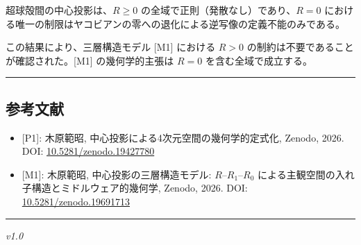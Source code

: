\documentclass[
  a4paper]{ltjsarticle}
\providecommand{\tightlist}{%
  \setlength{\itemsep}{0pt}\setlength{\parskip}{0pt}}
\begin{document}
超球殻間の中心投影は、\(R \geq 0\)
の全域で正則（発散なし）であり、\(R = 0\)
における唯一の制限はヤコビアンの零への退化による逆写像の定義不能のみである。

この結果により、三層構造モデル {[}M1{]} における \(R > 0\)
の制約は不要であることが確認された。{[}M1{]} の幾何学的主張は \(R = 0\)
を含む全域で成立する。

\begin{center}\rule{0.5\linewidth}{0.5pt}\end{center}

\subsection{参考文献}\label{ux53c2ux8003ux6587ux732e}

\begin{itemize}
\tightlist
\item
  {[}P1{]}: 木原範昭, 中心投影による4次元空間の幾何学的定式化, Zenodo,
  2026. DOI:
  \href{https://doi.org/10.5281/zenodo.19427780}{10.5281/zenodo.19427780}
\item
  {[}M1{]}: 木原範昭, 中心投影の三層構造モデル: \(R\)--\(R_1\)--\(R_0\)
  による主観空間の入れ子構造とミドルウェア的幾何学, Zenodo, 2026. DOI:
  \href{https://doi.org/10.5281/zenodo.19691713}{10.5281/zenodo.19691713}
\end{itemize}

\begin{center}\rule{0.5\linewidth}{0.5pt}\end{center}

\emph{v1.0}
\end{document}
